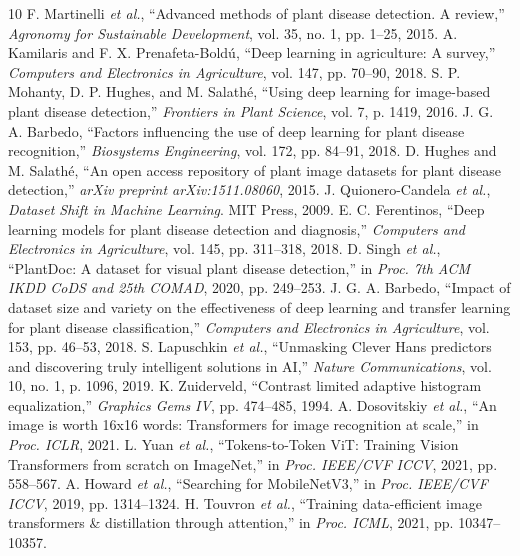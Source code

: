 \documentclass[10pt,journal,compsoc]{IEEEtran}
\begin{document}
\begin{table}[t]
\begin{table}[t]

\begin{thebibliography}{10}
 F. Martinelli \emph{et al.}, ``Advanced methods of plant disease detection. A review,'' \emph{Agronomy for Sustainable Development}, vol. 35, no. 1, pp. 1--25, 2015.
 A. Kamilaris and F. X. Prenafeta-Boldú, ``Deep learning in agriculture: A survey,'' \emph{Computers and Electronics in Agriculture}, vol. 147, pp. 70--90, 2018.
 S. P. Mohanty, D. P. Hughes, and M. Salathé, ``Using deep learning for image-based plant disease detection,'' \emph{Frontiers in Plant Science}, vol. 7, p. 1419, 2016.
 J. G. A. Barbedo, ``Factors influencing the use of deep learning for plant disease recognition,'' \emph{Biosystems Engineering}, vol. 172, pp. 84--91, 2018.
 D. Hughes and M. Salathé, ``An open access repository of plant image datasets for plant disease detection,'' \emph{arXiv preprint arXiv:1511.08060}, 2015.
 J. Quionero-Candela \emph{et al.}, \emph{Dataset Shift in Machine Learning}. MIT Press, 2009.
 E. C. Ferentinos, ``Deep learning models for plant disease detection and diagnosis,'' \emph{Computers and Electronics in Agriculture}, vol. 145, pp. 311--318, 2018.
 D. Singh \emph{et al.}, ``PlantDoc: A dataset for visual plant disease detection,'' in \emph{Proc. 7th ACM IKDD CoDS and 25th COMAD}, 2020, pp. 249--253.
 J. G. A. Barbedo, ``Impact of dataset size and variety on the effectiveness of deep learning and transfer learning for plant disease classification,'' \emph{Computers and Electronics in Agriculture}, vol. 153, pp. 46--53, 2018.
 S. Lapuschkin \emph{et al.}, ``Unmasking Clever Hans predictors and discovering truly intelligent solutions in AI,'' \emph{Nature Communications}, vol. 10, no. 1, p. 1096, 2019.
 K. Zuiderveld, ``Contrast limited adaptive histogram equalization,'' \emph{Graphics Gems IV}, pp. 474--485, 1994.
 A. Dosovitskiy \emph{et al.}, ``An image is worth 16x16 words: Transformers for image recognition at scale,'' in \emph{Proc. ICLR}, 2021.
 L. Yuan \emph{et al.}, ``Tokens-to-Token ViT: Training Vision Transformers from scratch on ImageNet,'' in \emph{Proc. IEEE/CVF ICCV}, 2021, pp. 558--567.
 A. Howard \emph{et al.}, ``Searching for MobileNetV3,'' in \emph{Proc. IEEE/CVF ICCV}, 2019, pp. 1314--1324.
 H. Touvron \emph{et al.}, ``Training data-efficient image transformers \& distillation through attention,'' in \emph{Proc. ICML}, 2021, pp. 10347--10357.

\end{thebibliography}
\end{table}
\end{table}
\end{document}

